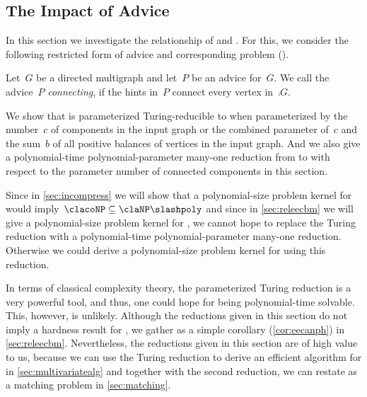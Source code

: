 \subsection{The Impact of Advice}\label{sec:wmeeslasha}

In this section we investigate the relationship of \pWMEEs{} and \pWMEEAs{}. For this, we consider the following restricted form of advice and corresponding problem \pWMEECA{} (\pWMEECAs{}).
\begin{definition}
  Let~$G$ be a directed multigraph and let~$P$ be an advice for~$G$. We call the advice~$P$ \emph{connecting}, if the hints in~$P$ connect every vertex in~$\comp{G}$.
\end{definition}
 \label{def:pWMEECA}

We show that \pWMEEs{} is parameterized Turing-reducible to \pWMEECAs{} when parameterized by the number~$c$ of components in the input graph or the combined parameter of~$c$ and the sum~$b$ of all positive balances of vertices in the input graph. And we also give a polynomial-time polynomial-parameter many-one reduction from \pWMEEAs{} to \pWMEEs{} with respect to the parameter number of connected components in this section. 

Since in \autoref{sec:incompress} we will show that a polynomial-size problem kernel for \pWMEEs{} would imply~$\clacoNP \subseteq \claNP \slashpoly$ and since in \autoref{sec:releecbm} we will give a polynomial-size problem kernel for \pWMEECAs{}, we cannot hope to replace the Turing reduction with a polynomial-time polynomial-parameter many-one reduction. Otherwise we could derive a polynomial-size problem kernel for \pWMEEs{} using this reduction. 

In terms of classical complexity theory, the parameterized Turing reduction is a very powerful tool, and thus, one could hope for \pWMEECAs{} being polynomial-time solvable. This, however, is unlikely. Although the reductions given in this section do not imply a hardness result for \pWMEECAs{}, we gather \NPhs{} as a simple corollary (\autoref{cor:eecanph}) in \autoref{sec:releecbm}. Nevertheless, the reductions given in this section are of high value to us, because we can use the Turing reduction to derive an efficient algorithm for \pWMEEs{} in \autoref{sec:multivariatealg} and together with the second reduction, we can restate \pWMEEs{} as a matching problem in \autoref{sec:matching}.

